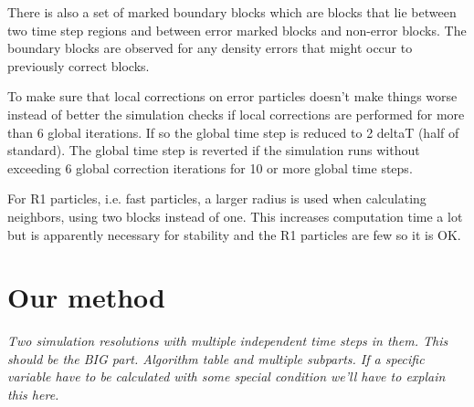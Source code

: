 \documentclass[../../main.tex]{subfiles}
\begin{document}
There is also a set of marked boundary blocks which are blocks that lie between two time step regions and between error marked blocks and non-error blocks. The boundary blocks are observed for any density errors that might occur to previously correct blocks. 

To make sure that local corrections on error particles doesn't make things worse instead of better the simulation checks if local corrections are performed for more than 6 global iterations. If so the global time step is reduced to 2 deltaT (half of standard). The global time step is reverted if the simulation runs without exceeding 6 global correction iterations for 10 or more global time steps. 

For R1 particles, i.e. fast particles, a larger radius is used when calculating neighbors, using two blocks instead of one. This increases computation time a lot but is apparently necessary for stability and the R1 particles are few so it is OK. 



\section{Our method}
\textit{Two simulation resolutions with multiple independent time steps in them. This should be the BIG part. Algorithm table and multiple subparts. If a specific variable have to be calculated with some special condition we'll have to explain this here.}
\end{document}
